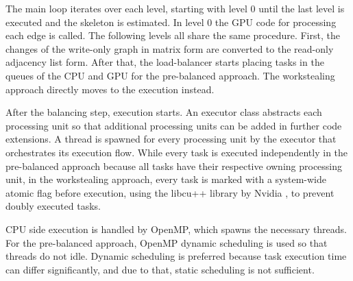 The main loop iterates over each level, starting with level 0 until the last level is executed and the skeleton is estimated. In level 0 the GPU code for processing each edge is called. The following levels all share the same procedure. First, the changes of the write-only graph in matrix form are converted to the read-only adjacency list form. After that, the load-balancer starts placing tasks in the queues of the CPU and GPU for the pre-balanced approach. The workstealing approach directly moves to the execution instead.

After the balancing step, execution starts. An executor class abstracts each processing unit so that additional processing units can be added in further code extensions. A thread is spawned for every processing unit by the executor that orchestrates its execution flow. While every task is executed independently in the pre-balanced approach because all tasks have their respective owning processing unit, in the workstealing approach, every task is marked with a system-wide atomic flag before execution, using the libcu++ library by Nvidia \cite{NVIDIALibcudacxx2021}, to prevent doubly executed tasks.

CPU side execution is handled by OpenMP, which spawns the necessary threads. For the pre-balanced approach, OpenMP dynamic scheduling is used so that threads do not idle. Dynamic scheduling is preferred because task execution time can differ significantly, and due to that, static scheduling is not sufficient.

